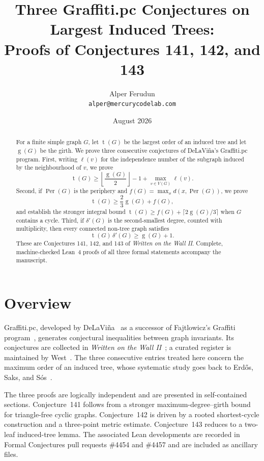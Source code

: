 \documentclass[11pt]{article}
\title{Three Graffiti.pc Conjectures on Largest Induced Trees:\\
Proofs of Conjectures 141, 142, and 143}
\author{Alper Ferudun\\\texttt{alper@mercurycodelab.com}}
\date{August 2026}
\numberwithin{equation}{section}
\theoremstyle{remark}
\newcommand{\tr}{\operatorname{t}}
\newcommand{\gr}{\operatorname{g}}
\newcommand{\lv}{\ell}
\newcommand{\Per}{\operatorname{Per}}
\newcommand{\dd}{\delta'}
\begin{document}
\maketitle

\begin{abstract}
For a finite simple graph $G$, let $\tr(G)$ be the largest order of an induced
tree and let $\gr(G)$ be the girth.  We prove three consecutive conjectures of
DeLaVi\~na's Graffiti.pc program.  First, writing $\lv(v)$ for the
independence number of the subgraph induced by the neighbourhood of $v$, we
prove
\[
 \tr(G)\ge \left\lfloor\frac{\gr(G)}2\right\rfloor-1+
 \max_{v\in V(G)}\lv(v).
\]
Second, if $\Per(G)$ is the periphery and
$f(G)=\max_x d(x,\Per(G))$, we prove
\[
 \tr(G)\ge \frac23\gr(G)+f(G),
\]
and establish the stronger integral bound
$\tr(G)\ge f(G)+\lceil2\gr(G)/3\rceil$ when $G$ contains a cycle.
Third, if $\dd(G)$ is the second-smallest degree, counted with multiplicity,
then every connected non-tree graph satisfies
\[
 \tr(G)\,\dd(G)\ge \gr(G)+1.
\]
These are Conjectures 141, 142, and 143 of \emph{Written on the Wall II}.
Complete, machine-checked Lean~4 proofs of all three formal statements
accompany the manuscript.
\end{abstract}

\tableofcontents

\section{Overview}
Graffiti.pc, developed by DeLaVi\~na~\cite{DeL01,DeLhistory} as a successor of
Fajtlowicz's Graffiti program~\cite{Faj88}, generates conjectural inequalities
between graph invariants.  Its conjectures are collected in \emph{Written on
the Wall II}~\cite{WOWII}; a curated register is maintained by
West~\cite{WestReg}.  The three consecutive entries treated here concern the
maximum order of an induced tree, whose systematic study goes back to
Erd\H{o}s, Saks, and S\'os~\cite{ESS86}.

The three proofs are logically independent and are presented in self-contained
sections.  Conjecture~141 follows from a stronger maximum-degree--girth bound
for triangle-free cyclic graphs.  Conjecture~142 is driven by a rooted
shortest-cycle construction and a three-point metric estimate.  Conjecture~143
reduces to a two-leaf induced-tree lemma.  The associated Lean developments
are recorded in Formal Conjectures pull requests \#4454 and \#4457
\cite{FC4454,FC4457} and are included as ancillary files.
\end{document}
